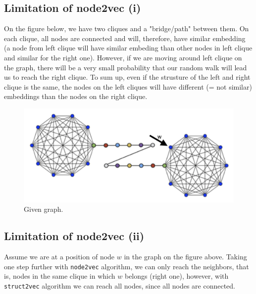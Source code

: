 \documentclass[a4paper,11pt]{article}
\begin{document}


\subsection{Limitation of node2vec (i)}

On the figure below, we have two cliques and a "bridge/path" between them. 
On each clique, all nodes are connected and will, therefore, have similar embedding (a node from left clique will have similar embeding than other nodes in left clique and similar for the right one).
However, if we are moving around left clique on the graph, there will be a very small probability that our random walk will lead us to reach the right clique. 
To sum up, even if the strusture of the left and right clique is the same, the nodes on the left cliques will have different (= not similar) embeddings than the nodes on the right clique.

\begin{figure}[ht!]
    \centering
    \includegraphics[width=130mm]{Figures/5_5.png}
    \caption{Given graph.} 
\end{figure}

\subsection{Limitation of node2vec (ii)}

Assume we are at a position of node $w$ in the graph on the figure above. Taking one step further with 
\texttt{node2vec} algorithm, we can only reach the neighbors, that is, nodes in the same clique in which $w$ belongs (right one), however, with \texttt{struct2vec} algorithm we can reach all nodes, since all nodes are connected.
\end{document}
